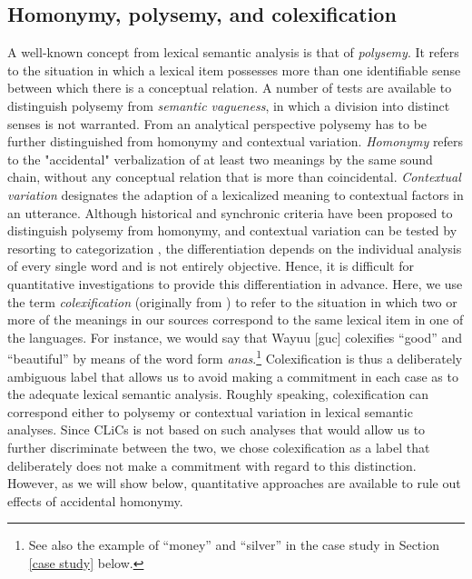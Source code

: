 \subsection{Homonymy, polysemy, and colexification}
A well-known concept from lexical semantic analysis is that of \emph{polysemy}. It refers to the situation
in which a lexical item possesses more than one identifiable sense between which there is a
conceptual relation. A number of tests are available to distinguish polysemy from \emph{semantic
vagueness}, in which a division into distinct senses is not warranted. From an analytical perspective
polysemy has to be further distinguished from {homonymy} and contextual variation.
\emph{Homonymy} refers to
the "accidental" verbalization of at least two meanings by the same sound chain, without any
conceptual relation that is more than coincidental. \emph{Contextual variation}
designates the adaption of a lexicalized meaning to contextual factors in an utterance. Although
historical and synchronic criteria have been proposed to distinguish polysemy from homonymy, and
contextual variation can be tested by resorting to categorization \cite{blank1997}, the
differentiation depends on the individual analysis of every single word and is not entirely
objective. Hence, it is difficult for quantitative investigations to provide this differentiation
in advance.
Here, we use the term \textit{colexification} (originally from )
to refer to the situation
in which two or more of the meanings in our sources correspond to the same lexical item in one of
the languages. For instance, we would say that Wayuu [guc] colexifies ``good'' and ``beautiful'' by means of the word form \textit{anas\textbari}.\footnote{See also the example of ``money'' and ``silver'' in the case study in Section \ref{case study} below.}
Colexification is thus a deliberately ambiguous label that allows us to avoid making a commitment in
each case as to the adequate lexical semantic analysis.
Roughly speaking,
colexification can correspond either to polysemy or contextual variation in lexical semantic analyses.
Since CLiCs is not based on such analyses that would allow us to further discriminate between the
two, we chose colexification as a label that deliberately does not make a commitment with regard to
this distinction. However, as we will show below, quantitative approaches are available to rule out effects of accidental homonymy. 

